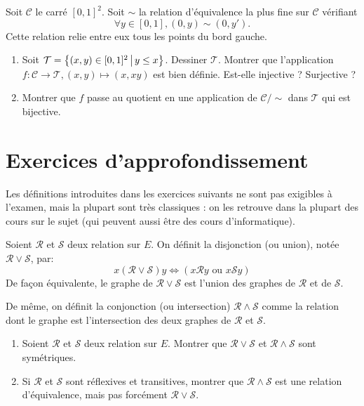 \begin{exercice}
Soit $\mathcal C$ le \og carré\fg{} $[0,1]^2$. Soit $\sim$ la relation d'équivalence la plus fine sur $\mathcal C$ vérifiant
\[ \forall y\in [0,1], (0,y)\sim (0,y').\]
Cette relation relie entre eux tous les points du \og bord gauche\fg.
\begin{enumerate}
\item Soit $\mathcal T=\ensemble{(x,y)\in [0,1]^2}{y\leq x}$. Dessiner $\mathcal T$. Montrer que l'application $f : \mathcal C\to \mathcal T, (x,y)\mapsto (x,xy) $ est bien définie. Est-elle injective ? Surjective ? 
\item Montrer que $f$ passe au quotient en une application de $\mathcal C/\sim$ dans $\mathcal T$ qui est bijective.
\end{enumerate}
\end{exercice}





\section{Exercices d'approfondissement}


Les définitions introduites dans les exercices suivants ne sont pas exigibles à l'examen, mais la plupart sont très classiques : on les retrouve dans la plupart des cours sur le sujet (qui peuvent aussi être des cours d'informatique).

\begin{exercice}\label{exo-union-intersection-relations}
Soient $\mathcal R$ et $\mathcal S$ deux relation sur $E$. On définit la disjonction (ou union), notée $\mathcal R \vee \mathcal S$, par:
\[ x (\mathcal R \vee \mathcal S) y \iff (x \mathcal R y\text{ ou } x \mathcal S y)\]
De façon équivalente, le graphe de $\mathcal R \vee \mathcal S$ est l'union des graphes de $\mathcal R$ et de $\mathcal S$.

De même, on définit la conjonction (ou intersection) $\mathcal R \wedge \mathcal S$ comme la relation dont le graphe est l'intersection des deux graphes de $\mathcal R$ et $\mathcal S$.


\begin{enumerate}
\item Soient $\mathcal R$ et $\mathcal S$ deux relation sur $E$. Montrer que $\mathcal R \vee \mathcal S$ et $\mathcal R \wedge \mathcal S$ sont symétriques.
\item Si $\mathcal R$ et $\mathcal S$ sont réflexives et transitives, montrer que $\mathcal R \wedge \mathcal S$ est une relation d'équivalence, mais pas forcément $\mathcal R \vee \mathcal S$.
\end{enumerate}
\end{exercice}


